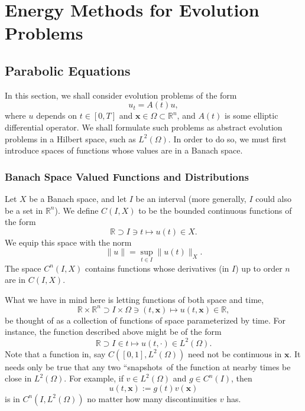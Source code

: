 \section{Energy Methods for Evolution Problems}\label{chap:energy-methods-evolution-problems}

\subsection{Parabolic Equations}\label{sec:parabolic-equations}

In this section, we shall consider evolution problems of the form\[u_t=A(t)u,\]where $u$ depends on $t\in[0,T]$ and $\bm{x}\in\Omega\subset\mathbb{R}^n$, and $A(t)$ is some elliptic differential operator. We shall formulate such problems as abstract evolution problems in a Hilbert space, such as $L^2(\Omega)$. In order to do so, we must first introduce spaces of functions whose values are in a Banach space.

\subsubsection{Banach Space Valued Functions and Distributions}\label{subsec:banach-valued-functions-distributions}

Let $X$ be a Banach space, and let $I$ be an interval (more generally, $I$ could also be a set in $\mathbb{R}^n$). We define $C(I,X)$ to be the bounded continuous functions of the form
\begin{equation}\label{eq:banach-valued-continuous-function-domain}
\mathbb{R}\supset I\ni t\mapsto u(t)\in X.
\end{equation}
We equip this space with the norm
\begin{equation}\label{eq:banach-valued-continuous-function-sup-norm}
\|u\|=\sup_{t\in I}\|u(t)\|_X.
\end{equation}
The space $C^n(I,X)$ contains functions whose derivatives (in $I$) up to order $n$ are in $C(I,X)$.

\begin{Example}
\label{ex:banach-valued-time-spatial-functions}
What we have in mind here is letting functions of both space and time,\[\mathbb{R}\times\mathbb{R}^n\supset I\times\Omega\ni(t,\bm{x})\mapsto u(t,\bm{x})\in\mathbb{R},\]be thought of as a collection of functions of space parameterized by time. For instance, the function described above might be of the form\[\mathbb{R}\supset I\in t\mapsto u(t,\cdot)\in L^2(\Omega).\]Note that a function in, say $C([0,1],L^2(\Omega))$ need not be continuous in $\bm{x}$. It needs only be true that any two ``snapshots\textquotesingle\textquotesingle\ of the function at nearby times be close in $L^2(\Omega)$. For example, if $v\in L^2(\Omega)$ and $g\in C^n(I)$, then\[u(t,\bm{x}):=g(t)v(\bm{x})\]is in $C^n(I,L^2(\Omega))$ no matter how many discontinuities $v$ has.
\end{Example}

